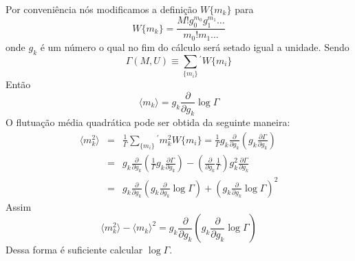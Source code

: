 Por conveniência nós modificamos a definição $W\{m_{k}\}$ para
\begin{equation}
W\{m_{k}\}=\frac{M!g_{0}^{m_{0}}g_{1}^{m_{1}}\dots}{m_{0}!m_{1}\dots}
\end{equation}
onde $g_{k}$ é um número o qual no fim do cálculo será setado igual a unidade. Sendo
\begin{equation}
\Gamma(M,U)\equiv \sum_{\{m_{i}\}} {}^{'} W\{m_{i}\}
\label{Gamma_de_MeU}
\end{equation}
Então
\begin{equation}
\langle m_{k}\rangle = g_{k} \frac{\partial}{\partial g_{k}} \log \Gamma
\label{mk_de_gk}
\end{equation}
O flutuação média quadrática pode ser obtida da seguinte maneira:
\begin{eqnarray*}
\langle m_{k}^{2} \rangle &=&\frac{1}{\Gamma}\sum_{\{m_{i}\}} {}^{\prime} m_{k}^{2}W\{m_{i}\}=\frac{1}{\Gamma}g_{k} \frac{\partial}{\partial g_{k}} \left(g_{k} \frac{\partial \Gamma}{\partial g_{k}} \right)\\
&=&g_{k} \frac{\partial}{\partial g_{k}} \left(\frac{1}{\Gamma} g_{k} \frac{\partial \Gamma}{\partial g_{k}} \right)-\left(\frac{\partial}{\partial g_{k}}\frac{1}{\Gamma}\right) g_{k}^{2}\frac{\partial \Gamma}{\partial g_{k}}\\
&=&g_{k} \frac{\partial}{\partial g_{k}} \left(g_{k} \frac{\partial}{\partial g_{k}} \log \Gamma \right)+\left(g_{k} \frac{\partial}{\partial g_{k}} \log \Gamma \right)^{2}
\end{eqnarray*}
Assim
\begin{equation}
\langle m_{k}^{2}\rangle-\langle m_{k}\rangle^{2}=g_{k} \frac{\partial}{\partial g_{k}} \left(g_{k} \frac{\partial}{\partial g_{k}} \log \Gamma \right)
\end{equation}
Dessa forma é suficiente calcular $\log \Gamma$.

